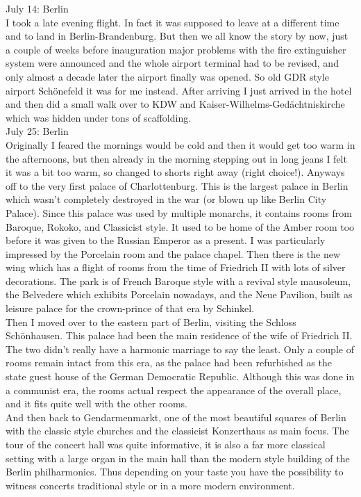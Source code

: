 July 14: Berlin\\
I took a late evening flight. In fact it was supposed to leave at a different time and to land in Berlin-Brandenburg. But then we all know the story by now, just a couple of weeks before inauguration major problems with the fire extinguisher system were announced and the whole airport terminal had to be revised, and only almost a decade later the airport finally was opened. So old GDR style airport Sch\"onefeld it was for me instead. After arriving I just arrived in the hotel and then did a small walk over to KDW and Kaiser-Wilhelms-Ged\"achtniskirche which was hidden under tons of scaffolding.\\

July 25: Berlin\\
Originally I feared the mornings would be cold and then it would get too warm in the afternoons, but then already in the morning stepping out in long jeans I felt it was a bit too warm, so changed to shorts right away (right choice!). Anyways off to the very first palace of Charlottenburg. This is the largest palace in Berlin which wasn't completely destroyed in the war (or blown up like Berlin City Palace). Since this palace was used by multiple monarchs, it contains rooms from Baroque, Rokoko, and Classicist style. It used to be home of the Amber room too before it was given to the Russian Emperor as a present. I was particularly impressed by the Porcelain room and the palace chapel. Then there is the new wing which has a flight of rooms from the time of Friedrich II with lots of silver decorations. The park is of French Baroque style with a revival style mausoleum, the Belvedere which exhibits Porcelain nowadays, and the Neue Pavilion, built as leisure palace for the crown-prince of that era by Schinkel.\\
Then I moved over to the eastern part of Berlin, visiting the Schloss Sch\"onhausen. This palace had been the main residence of the wife of Friedrich II. The two didn't really have a harmonic marriage to say the least. Only a couple of rooms remain intact from this era, as the palace had been refurbished as the state guest house of the German Democratic Republic. Although this was done in a communist era, the rooms actual respect the appearance of the overall place, and it fits quite well with the other rooms.\\
And then back to Gendarmenmarkt, one of the most beautiful squares of Berlin with the classic style churches and the classicist Konzerthaus as main focus. The tour of the concert hall was quite informative, it is also a far more classical setting with a large organ in the main hall than the modern style building of the Berlin philharmonics. Thus depending on your taste you have the possibility to witness concerts traditional style or in a more modern environment. \\
